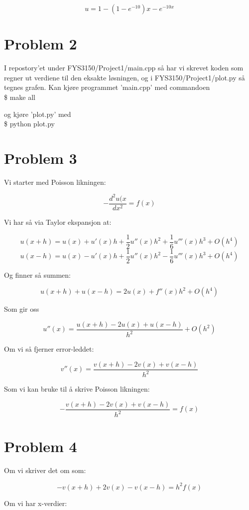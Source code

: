\documentclass[english,notitlepage]{revtex4-1}  %
\begin{document}
\begin{equation}\label{equ}
u = 1 - (1-e^{-10})x - e^{-10x}
\end{equation}


\section*{Problem 2}

I repostory'et under FYS3150/Project1/main.cpp så har vi skrevet koden som regner ut verdiene til den eksakte løsningen, og i FYS3150/Project1/plot.py så tegnes grafen. Kan kjøre programmet 'main.cpp' med commandoen \\

\$ make all

og kjøre 'plot.py' med \\

\$ python plot.py

\section*{Problem 3}

Vi starter med Poisson likningen:

$$ -\frac{d^2 u(x}{dx^2} = f(x)$$

Vi har så via Taylor ekspansjon at:

$$u(x + h) = u(x) + u'(x)h + \frac{1}{2}u''(x)h^2 + \frac{1}{6}u'''(x)h^3 + O(h^4)$$
$$u(x - h) = u(x) - u'(x)h + \frac{1}{2}u''(x)h^2 - \frac{1}{6}u'''(x)h^3 + O(h^4)$$

Og finner så summen:

$$u(x+h)+u(x-h) = 2u(x) + f''(x)h^2 + O(h^4)$$

Som gir oss

$$u''(x) = \frac{u(x+h)-2u(x)+u(x-h)}{h^2} + O(h^2)$$

Om vi så fjerner error-leddet:

$$v''(x) = \frac{v(x+h)-2v(x)+v(x-h)}{h^2}$$

Som vi kan bruke til å skrive Poisson likningen:

$$-\frac{v(x+h)-2v(x)+v(x-h)}{h^2} = f(x)$$

\section*{Problem 4}

Om vi skriver det om som:

$$-v(x+h)+2v(x)-v(x-h) = h^2f(x)$$

Om vi har x-verdier:
\end{document}
